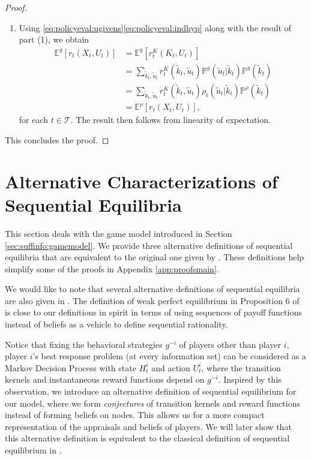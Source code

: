 \documentclass[pdflatex,sn-basic]{sn-jnl}
\newcommand{\E}{\mathbb{E}}
\renewcommand{\Pr}{\mathbb{P}}
\newcommand{\Comp}{K}
\newcommand{\comp}{k}
\theoremstyle{thmstyleone}%
\theoremstyle{thmstyletwo}%
\theoremstyle{thmstylethree}%
\begin{document}
\begin{appendices}
\begin{proof}
\begin{enumerate}[(1)]
	
	    Therefore we have established the induction step.
		\item Using \eqref{eq:policyeval:ugivens}\eqref{eq:policyeval:indhyp} along with the result of part (1), we obtain
		\begin{align}
			\E^g[r_{t}(X_t, U_t)] &= \E^g[r_{t}^{\Comp}(\Comp_t, U_t)] \\
			&=\sum_{\tilde{\comp}_t, \tilde{u}_t} r_t^{\Comp}(\tilde{\comp}_t, \tilde{u}_t) \Pr^g(\tilde{u}_t|\tilde{\comp}_t) \Pr^g(\tilde{\comp}_t) \\
			&=\sum_{\tilde{\comp}_t, \tilde{u}_t} r_t^{\Comp}(\tilde{\comp}_t, \tilde{u}_t) \rho_t(\tilde{u}_t|\tilde{\comp}_t) \Pr^\rho(\tilde{\comp}_t)\\
			&=\E^\rho[r_{t}(X_t, U_t)],
		\end{align}
		for each $t\in\mathcal{T}$. The result then follows from linearity of expectation.
	\end{enumerate}
 This concludes the proof.
\end{proof}

\section{Alternative Characterizations of Sequential Equilibria}\label{app:SE}
This section deals with the game model introduced in Section \ref{sec:suffinfo:gamemodel}. We provide three alternative definitions of sequential equilibria that are equivalent to the original one given by \cite{kreps1982sequential}. These definitions help simplify some of the proofs in Appendix \ref{app:proofsmain}.

We would like to note that several alternative definitions of sequential equilibria are also given in \cite{kreps1982sequential,halpern2009nonstandard}. The definition of {weak perfect equilibrium} in Proposition 6 of \cite{kreps1982sequential} is close to our definitions in spirit in terms of using sequences of payoff functions instead of beliefs as a vehicle to define
sequential rationality.

Notice that fixing the behavioral strategies $g^{-i}$ of players other than player $i$, player $i$'s best response problem (at every information set) can be considered as a Markov Decision Process with state $H_t^i$ and action $U_t^i$, where the transition kernels and instantaneous reward functions depend on $g^{-i}$. Inspired by this observation, we introduce an alternative definition of sequential equilibrium for our model, where we form \emph{conjectures} of transition kernels and reward functions instead of forming beliefs on nodes. This allows us for a more compact representation of the appraisals and beliefs of players. We will later show that this alternative definition is equivalent to the classical definition of sequential equilibrium in \cite{kreps1982sequential}.


\end{appendices}
\end{document}
